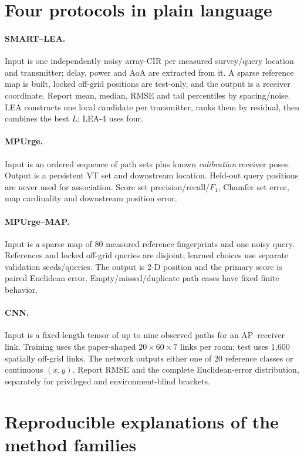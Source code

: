 \documentclass[10pt,a4paper]{article}
\begin{document}
\section{Four protocols in plain language}
\paragraph{SMART--LEA.} Input is one independently noisy array-CIR per measured survey/query location and transmitter; delay, power and AoA are extracted from it. A sparse reference map is built, locked off-grid positions are test-only, and the output is a receiver coordinate. Report mean, median, RMSE and tail percentiles by spacing/noise. LEA constructs one local candidate per transmitter, ranks them by residual, then combines the best $L$; LEA-4 uses four.

\paragraph{MPUrge.} Input is an ordered sequence of path sets plus known \emph{calibration} receiver poses. Output is a persistent VT set and downstream location. Held-out query positions are never used for association. Score set precision/recall/$F_1$, Chamfer set error, map cardinality and downstream position error.

\paragraph{MPUrge--MAP.} Input is a sparse map of 80 measured reference fingerprints and one noisy query. References and locked off-grid queries are disjoint; learned choices use separate validation seeds/queries. The output is 2-D position and the primary score is paired Euclidean error. Empty/missed/duplicate path cases have fixed finite behavior.

\paragraph{CNN.} Input is a fixed-length tensor of up to nine observed paths for an AP--receiver link. Training uses the paper-shaped $20\times60\times7$ links per room; test uses 1,600 spatially off-grid links. The network outputs either one of 20 reference classes or continuous $(x,y)$. Report RMSE and the complete Euclidean-error distribution, separately for privileged and environment-blind brackets.

\section{Reproducible explanations of the method families}
\end{document}
